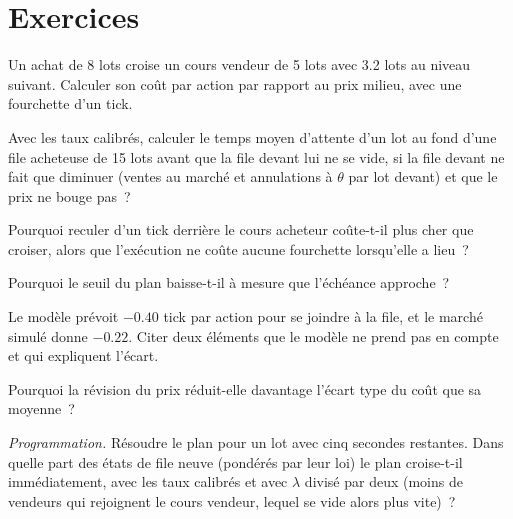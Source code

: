 \section{Exercices}

\begin{exercise}[$\star$]\label{exo:mx:child-order-placement:1}
Un achat de 8 lots croise un cours vendeur de 5 lots avec 3.2 lots au niveau suivant. Calculer son coût par action par rapport au prix milieu, avec une fourchette d'un tick.
\end{exercise}

\begin{exercise}[$\star$]\label{exo:mx:child-order-placement:2}
Avec les taux calibrés, calculer le temps moyen d'attente d'un lot au fond d'une file acheteuse de 15 lots avant que la file devant lui ne se vide, si la file devant
ne fait que diminuer (ventes au marché et annulations à $\theta$ par lot devant) et que le prix ne bouge pas~?
\end{exercise}

\begin{exercise}[$\star$]\label{exo:mx:child-order-placement:3}
Pourquoi reculer d'un tick derrière le cours acheteur coûte-t-il plus cher que croiser, alors que l'exécution ne coûte aucune fourchette lorsqu'elle a lieu~?
\end{exercise}

\begin{exercise}[$\star\star$]\label{exo:mx:child-order-placement:4}
Pourquoi le seuil du plan baisse-t-il à mesure que l'échéance approche~?
\end{exercise}

\begin{exercise}[$\star\star$]\label{exo:mx:child-order-placement:5}
Le modèle prévoit $-0.40$ tick par action pour se joindre à la file, et le marché simulé donne $-0.22$. Citer deux éléments que le modèle ne prend pas en compte et qui expliquent l'écart.
\end{exercise}

\begin{exercise}[$\star\star$]\label{exo:mx:child-order-placement:6}
Pourquoi la révision du prix réduit-elle davantage l'écart type du coût que sa moyenne~?
\end{exercise}

\begin{exercise}[$\star\star\star$]\label{exo:mx:child-order-placement:7}
\emph{Programmation.} Résoudre le plan pour un lot avec cinq secondes restantes. Dans quelle part des états de file neuve (pondérés par leur loi) le plan croise-t-il
immédiatement, avec les taux calibrés et avec $\lambda$ divisé par deux (moins de vendeurs qui rejoignent le cours vendeur, lequel se vide alors plus vite)~?
\end{exercise}

